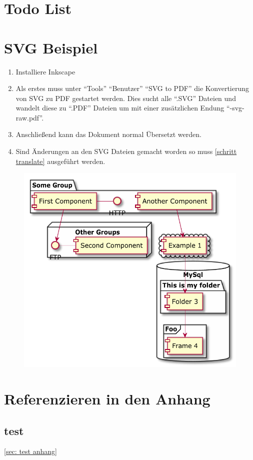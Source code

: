 \documentclass[./\jobname.tex]{subfiles}
\begin{document}
\chapter{Todo List}
%
\lipsum[1] 
\lipsum[2] 
\lipsum[3]
%
\chapter{SVG Beispiel}
%
\begin{enumerate}
	\item Installiere Inkscape
	\item Als erstes muss unter \enquote{Tools} \pfeil \enquote{Benutzer} \pfeil \enquote{SVG to PDF} die Konvertierung von SVG zu PDF gestartet werden. Dies sucht alle \enquote{.SVG} Dateien und wandelt diese zu \enquote{.PDF} Dateien um mit einer zusätzlichen Endung \enquote{-svg-raw.pdf}.\label{schritt translate}
	\item Anschließend kann das Dokument normal Übersetzt werden.
	\item Sind Änderungen an den SVG Dateien gemacht worden so muss \ref{schritt translate} ausgeführt werden.
\end{enumerate}
%
\begin{figure}[H]
	\centering
	\includegraphics[width=0.75\linewidth]{./img/svg/Component_Diagram-test-svg-raw.pdf}
	\label{fig: beispiel svg}
\end{figure}
%
\chapter{Referenzieren in den Anhang}
%
\section{test}
%
\autoref{sec: test anhang}
%
\end{document}
